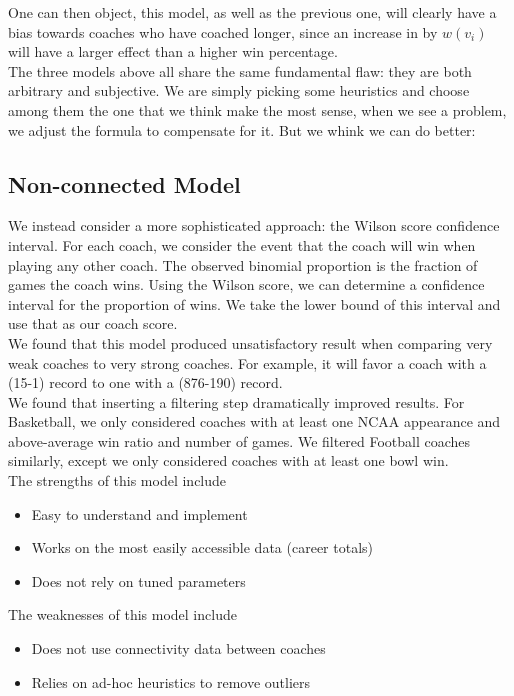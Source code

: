 \documentclass[titlepage]{article}
\begin{document}
\noindent One can then object, this model, as well as the previous one, will clearly have a bias towards coaches who have coached longer, since an increase in by $w(v_i)$ will have a larger effect than a higher win percentage.
\\

\noindent The three models above all share the same fundamental flaw: they are both arbitrary and subjective. We are simply picking some heuristics and choose among them the one that we think make the most sense, when we see a problem, we adjust the formula to compensate for it. But we whink we can do better:

\subsection{Non-connected Model}

We instead consider a more sophisticated approach: the Wilson score confidence interval. For each coach, we consider the event that the coach will win when playing any other coach. The observed binomial proportion is the fraction of games the coach wins. Using the Wilson score, we can determine a confidence interval for the proportion of wins. We take the lower bound of this interval and use that as our coach score.
\\

\noindent We found that this model produced unsatisfactory result when comparing very weak coaches to very strong coaches. For example, it will favor a coach with a (15-1) record to one with a (876-190) record.
\\

\noindent We found that inserting a filtering step dramatically improved results. For Basketball, we only considered coaches with at least one NCAA appearance and above-average win ratio and number of games. We filtered Football coaches similarly, except we only considered coaches with at least one bowl win.
\\

\noindent The strengths of this model include 
\begin{itemize}
\item Easy to understand and implement
\item Works on the most easily accessible data (career totals)
\item Does not rely on tuned parameters
\end{itemize}

\noindent The weaknesses of this model include
\begin{itemize}
\item Does not use connectivity data between coaches
\item Relies on ad-hoc heuristics to remove outliers
\end{itemize}
\end{document}
